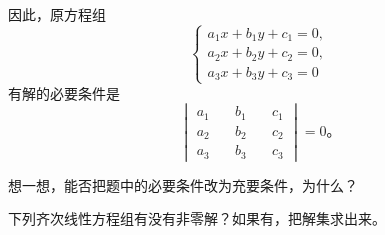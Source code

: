 因此，原方程组
$$\begin{cases}
    a_1x + b_1y + c_1 = 0, \\
    a_2x + b_2y + c_2 = 0, \\
    a_3x + b_3y + c_3 = 0
\end{cases}$$
有解的必要条件是
$$\begin{vmatrix*}
	a_1 \quad & b_1 \quad & c_1 \\
	a_2 \quad & b_2 \quad & c_2 \\
	a_3 \quad & b_3 \quad & c_3
\end{vmatrix*} = 0 \text{。}$$

想一想，能否把题中的必要条件改为充要条件，为什么？

\lianxi

下列齐次线性方程组有没有非零解？如果有，把解集求出来。

\begin{xiaoxiaotis}
\end{xiaoxiaotis}

